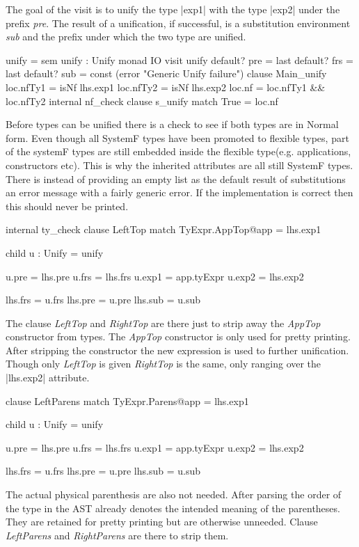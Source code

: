 The goal of the visit is to unify the type |exp1| with the type |exp2| under the prefix \emph{pre}. The result of a unification, if successful, is a substitution environment \emph{sub} and the prefix under which the two type are unified.

\begin{code}
unify = sem unify : Unify monad IO    
          visit unify
             default? pre  = last
             default? frs  = last
             default? sub  = const (error "Generic Unify failure")
             clause Main_unify
               loc.nfTy1  = isNf lhs.exp1
               loc.nfTy2  = isNf lhs.exp2
               loc.nf     = loc.nfTy1 && loc.nfTy2
               internal nf_check
                 clause s_unify
                   match True  = loc.nf
\end{code}
Before types can be unified there is a check to see if both types are in Normal form. Even though all SystemF types have been promoted to flexible types, part of the systemF types are still embedded inside the flexible type(e.g. applications, constructors etc). This is why the inherited attributes are all still SystemF types. There is instead of providing an empty list as the default result of substitutions an error message with a fairly generic error. If the implementation is correct then this should never be printed.

\begin{code}
internal ty_check
  clause LeftTop
    match TyExpr.AppTop@app = lhs.exp1
    
    child u : Unify = unify
    
    u.pre    = lhs.pre
    u.frs    = lhs.frs
    u.exp1   = app.tyExpr
    u.exp2   = lhs.exp2
             
    lhs.frs  = u.frs
    lhs.pre  = u.pre
    lhs.sub  = u.sub
\end{code}
The clause \emph{LeftTop} and \emph{RightTop} are there just to strip away the \emph{AppTop} constructor from types. The \emph{AppTop} constructor is only used for pretty printing. After stripping the constructor the new expression is used to further unification. Though only \emph{LeftTop} is given \emph{RightTop} is the same, only ranging over the |lhs.exp2| attribute.

\begin{code}
clause LeftParens
  match TyExpr.Parens@app = lhs.exp1
  
  child u : Unify = unify
  
  u.pre    = lhs.pre
  u.frs    = lhs.frs
  u.exp1   = app.tyExpr
  u.exp2   = lhs.exp2
           
  lhs.frs  = u.frs
  lhs.pre  = u.pre
  lhs.sub  = u.sub
\end{code}
The actual physical parenthesis are also not needed. After parsing the order of the type in the AST already denotes the intended meaning of the parentheses. They are retained for pretty printing but are otherwise unneeded. Clause \emph{LeftParens} and \emph{RightParens} are there to strip them.

